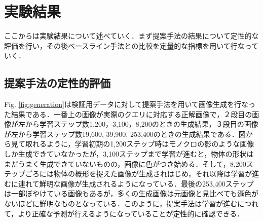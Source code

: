 \section{実験結果}
ここからは実験結果について述べていく．まず提案手法の結果について定性的な評価を行い，その後ベースライン手法との比較を定量的な指標を用いて行なっていく．
\subsection{提案手法の定性的評価}
Fig. \ref{fig:generation}は検証用データに対して提案手法を用いて画像生成を行なった結果である．一番上の画像が実際のクエリに対応する正解画像で，２段目の画像が左から学習ステップ数1,200，3,100，8,200のときの生成結果，３段目の画像が左から学習ステップ数19,600, 39,900, 253,400のときの生成結果である．図から見て取れるように，学習初期の1,200ステップ時はモノクロの影のような画像しか生成できていなかったが，3,100ステップまで学習が進むと，物体の形状はまだうまく生成できていないものの，画像に色がつき始める．そして，8,200ステップごろには物体の概形を捉えた画像が生成されはじめ，それ以降は学習が進むに連れて鮮明な画像が生成されるようになっている．最後の253,400ステップは一部ぼやけている画像もあるが，多くの生成画像は元画像と見比べても遜色がないほどに鮮明なものとなっている．このように，提案手法は学習が進むにつれて，より正確な予測が行えるようになっていることが定性的に確認できる．

